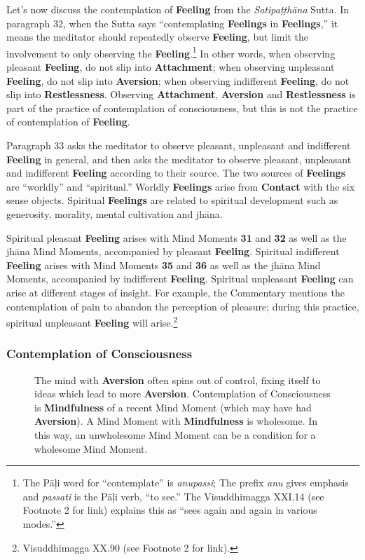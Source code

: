 Let’s now discuss the contemplation of \textbf{Feeling} from the \textit{Satipaṭṭhāna} Sutta. In paragraph 32, when the Sutta says “contemplating \textbf{Feelings} in \textbf{Feelings},” it means the meditator should repeatedly observe \textbf{Feeling}, but limit the involvement to only observing the \textbf{Feeling}.\footnote{The Pāḷi word for “contemplate” is \textit{anupassi}; The prefix \textit{anu} gives emphasis and \textit{passati} is the Pāḷi verb, “to see.” The Visuddhimagga XXI.14 (see Footnote 2 for link) explains this as “sees again and again in various modes.”} In other words, when observing pleasant \textbf{Feeling}, do not slip into \textbf{Attachment}; when observing unpleasant \textbf{Feeling}, do not slip into \textbf{Aversion}; when observing indifferent \textbf{Feeling}, do not slip into \textbf{Restlessness}. Observing \textbf{Attachment}, \textbf{Aversion} and \textbf{Restlessness} is part of the practice of contemplation of consciousness, but this is not the practice of contemplation of \textbf{Feeling}.

Paragraph 33 asks the meditator to observe pleasant, unpleasant and indifferent \textbf{Feeling} in general, and then asks the meditator to observe pleasant, unpleasant and indifferent \textbf{Feeling} according to their source. The two sources of \textbf{Feelings} are “worldly” and “spiritual.” Worldly \textbf{Feelings} arise from \textbf{Contact} with the six sense objects. Spiritual \textbf{Feelings} are related to spiritual development such as generosity, morality, mental cultivation and jhāna.

Spiritual pleasant \textbf{Feeling} arises with Mind Moments \textbf{31} and \textbf{32} as well as the jhāna Mind Moments, accompanied by pleasant \textbf{Feeling}. Spiritual indifferent \textbf{Feeling} arises with Mind Moments \textbf{35} and \textbf{36} as well as the jhāna Mind Moments, accompanied by indifferent \textbf{Feeling}. Spiritual unpleasant \textbf{Feeling} can arise at different stages of insight. For example, the Commentary mentions the contemplation of pain to abandon the perception of pleasure; during this practice, spiritual unpleasant \textbf{Feeling} will arise.\footnote{Visuddhimagga XX.90 (see Footnote 2 for link).}

\subsubsection*{Contemplation of Consciousness}

\begin{figure}[H]
\centering

\caption{The mind with \textbf{Aversion} often spins out of control, fixing itself to ideas which lead to more \textbf{Aversion}. Contemplation of Consciousness is \textbf{Mindfulness} of a recent Mind Moment (which may have had \textbf{Aversion}). A Mind Moment with \textbf{Mindfulness} is wholesome. In this way, an unwholesome Mind Moment can be a condition for a wholesome Mind Moment.}
\label{fig:Aversion}
\end{figure}

